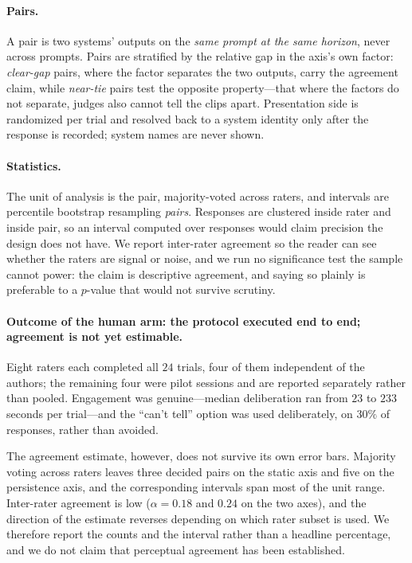 \documentclass[10pt,twocolumn,letterpaper]{article}
\begin{document}
\paragraph{Pairs.}
A pair is two systems' outputs on the \emph{same prompt at the same horizon},
never across prompts. Pairs are stratified by the relative gap in the axis's own
factor: \emph{clear-gap} pairs, where the factor separates the two outputs, carry
the agreement claim, while \emph{near-tie} pairs test the opposite property---that
where the factors do not separate, judges also cannot tell the clips apart.
Presentation side is randomized per trial and resolved back to a system
identity only after the response is recorded; system names are never shown.

\paragraph{Statistics.}
The unit of analysis is the pair, majority-voted across raters, and intervals
are percentile bootstrap resampling \emph{pairs}. Responses are clustered inside
rater and inside pair, so an interval computed over responses would claim
precision the design does not have. We report inter-rater agreement so the
reader can see whether the raters are signal or noise, and we run no
significance test the sample cannot power: the claim is descriptive agreement,
and saying so plainly is preferable to a $p$-value that would not survive
scrutiny.



\paragraph{Outcome of the human arm: the protocol executed end to end; agreement is not yet estimable.}
Eight raters each completed all $24$ trials, four of them independent of the
authors; the remaining four were pilot sessions and are reported separately
rather than pooled. Engagement was genuine---median deliberation ran from $23$
to $233$ seconds per trial---and the ``can't tell'' option was used
deliberately, on $30\%$ of responses, rather than avoided.

The agreement estimate, however, does not survive its own error bars. Majority
voting across raters leaves three decided pairs on the static axis and five on
the persistence axis, and the corresponding intervals span most of the unit
range. Inter-rater agreement is low ($\alpha = 0.18$ and $0.24$ on the two
axes), and the direction of the estimate reverses depending on which rater
subset is used. We therefore report the counts and the interval rather than a
headline percentage, and we do not claim that perceptual agreement has been
established.
\end{document}

